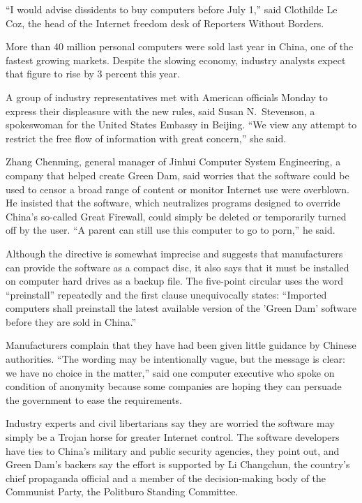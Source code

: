 \documentclass[12pt,a4paper,onecolumn]{article}
\begin{document}
``I would advise dissidents to buy computers before July 1,'' said Clothilde Le Coz, the head of the
Internet freedom desk of Reporters Without Borders.

More than 40 million personal computers were sold last year in China, one of the fastest growing
markets. Despite the slowing economy, industry analysts expect that figure to rise by 3 percent this
year.

A group of industry representatives met with American officials Monday to express their displeasure
with the new rules, said Susan N.~Stevenson, a spokeswoman for the United States Embassy in Beijing.
``We view any attempt to restrict the free flow of information with great concern,'' she said.

Zhang Chenming, general manager of Jinhui Computer System Engineering, a company that helped create
Green Dam, said worries that the software could be used to censor a broad range of content or
monitor Internet use were overblown. He insisted that the software, which neutralizes programs
designed to override China's so-called Great Firewall, could simply be deleted or temporarily turned
off by the user. ``A parent can still use this computer to go to porn,'' he said.

Although the directive is somewhat imprecise and suggests that manufacturers can provide the
software as a compact disc, it also says that it must be installed on computer hard drives as a
backup file. The five-point circular uses the word ``preinstall'' repeatedly and the first clause
unequivocally states: ``Imported computers shall preinstall the latest available version of the
'Green Dam' software before they are sold in China.''

Manufacturers complain that they have had been given little guidance by Chinese authorities. ``The
wording may be intentionally vague, but the message is clear: we have no choice in the matter,''
said one computer executive who spoke on condition of anonymity because some companies are hoping
they can persuade the government to ease the requirements.

Industry experts and civil libertarians say they are worried the software may simply be a Trojan
horse for greater Internet control. The software developers have ties to China's military and public
security agencies, they point out, and Green Dam's backers say the effort is supported by Li
Changchun, the country's chief propaganda official and a member of the decision-making body of the
Communist Party, the Politburo Standing Committee.
\end{document}
